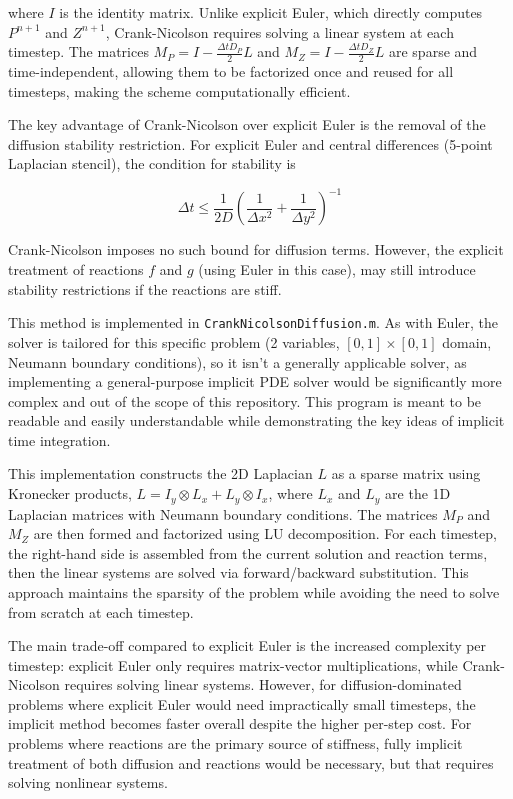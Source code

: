 \documentclass[11pt,oneside,parskip=half]{scrbook}  %
\begin{document}
where $I$ is the identity matrix. Unlike explicit Euler, which directly computes $P^{n+1}$ and $Z^{n+1}$, Crank-Nicolson requires solving a linear system at each timestep. The matrices $M_P = I-\frac{\Delta t D_P}{2}L$ and $M_Z = I-\frac{\Delta t D_Z}{2}L$ are sparse and time-independent, allowing them to be factorized once and reused for all timesteps, making the scheme computationally efficient.

The key advantage of Crank-Nicolson over explicit Euler is the removal of the diffusion stability restriction. For explicit Euler and central differences (5-point Laplacian stencil), the condition for stability is

$$
\Delta t \le \frac{1}{2D}\left(\frac{1}{\Delta x^2}+\frac{1}{\Delta y^2}\right)^{-1}
$$

Crank-Nicolson imposes no such bound for diffusion terms. However, the explicit treatment of reactions $f$ and $g$ (using Euler in this case), may still introduce stability restrictions if the reactions are stiff.

This method is implemented in \texttt{CrankNicolsonDiffusion.m}. As with Euler, the solver is tailored for this specific problem (2 variables, $[0,1]\times[0,1]$ domain, Neumann boundary conditions), so it isn't a generally applicable solver, as implementing a general-purpose implicit PDE solver would be significantly more complex and out of the scope of this repository. This program is meant to be readable and easily understandable while demonstrating the key ideas of implicit time integration.

This implementation constructs the 2D Laplacian $L$ as a sparse matrix using Kronecker products, $L = I_y \otimes L_x + L_y \otimes I_x$, where $L_x$ and $L_y$ are the 1D Laplacian matrices with Neumann boundary conditions. The matrices $M_P$ and $M_Z$ are then formed and factorized using LU decomposition. For each timestep, the right-hand side is assembled from the current solution and reaction terms, then the linear systems are solved via forward/backward substitution. This approach maintains the sparsity of the problem while avoiding the need to solve from scratch at each timestep.

The main trade-off compared to explicit Euler is the increased complexity per timestep: explicit Euler only requires matrix-vector multiplications, while Crank-Nicolson requires solving linear systems. However, for diffusion-dominated problems where explicit Euler would need impractically small timesteps, the implicit method becomes faster overall despite the higher per-step cost. For problems where reactions are the primary source of stiffness, fully implicit treatment of both diffusion and reactions would be necessary, but that requires solving nonlinear systems.
\end{document}
